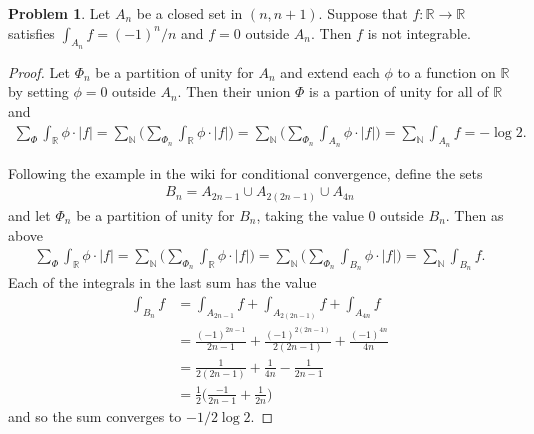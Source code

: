 \documentclass[20pt]{article}
\theoremstyle{plain}
\theoremstyle{definition}
\newtheorem*{problem}{Problem}
\newcommand{\reals}{\mathbb{R}}
\newcommand{\naturals}{\mathbb{N}}
\begin{document}
\begin{problem}{3.38}
  Let $A_n$ be a closed set in $(n, n+1)$. Suppose that $f: \reals \to \reals$
  satisfies $\int_{A_n}f = (-1)^n/n$ and $f=0$ outside $A_n.$ 
  Then $f$ is not integrable.
\end{problem}

\begin{proof}
  Let $\Phi_n$ be a partition of unity for $A_n$ and extend each 
  $\phi$ to a function on $\mathbb{R}$ by setting $\phi=0$ outside 
  $A_n$.
  Then their union $\Phi$ is a partion of unity for all of $\mathbb{R}$
  and 
  \begin{align*}
    \sum_\Phi \int_\mathbb{R} \phi \cdot |f| = 
    \sum_\naturals \bigg( \sum_{\Phi_n} \int_\reals \phi \cdot |f| \bigg) = 
    \sum_\naturals \bigg( \sum_{\Phi_n} \int_{A_n} \phi \cdot |f| \bigg) = 
    \sum_\naturals \int_{A_n}f = -\log 2.
  \end{align*}

  Following the example in the wiki for conditional convergence, 
  define the sets 
  \begin{align*}
    B_n = A_{2n - 1} \cup A_{2(2n-1)} \cup A_{4n}
  \end{align*}
  and let $\Phi_n$ be a partition of unity for $B_n$, taking the 
  value $0$ outside $B_n$.  Then as above
  \begin{align*}
    \sum_\Phi \int_\reals \phi \cdot |f| = 
    \sum_\naturals \bigg(\sum_{\Phi_n} \int_\reals \phi \cdot |f| \bigg) = 
    \sum_\naturals \bigg(\sum_{\Phi_n} \int_{B_n} \phi \cdot |f| \bigg) = 
    \sum_\naturals \int_{B_n}f.
  \end{align*} 
  Each of the integrals in the last sum has the value 
  \begin{align*}
    \int_{B_n}f
    &= \int_{A_{2n-1}}f + \int_{A_{2(2n-1)}}f + \int_{A_{4n}}f \\
    &=  \frac{(-1)^{2n-1}}{2n-1} + 
        \frac{(-1)^{2(2n-1)}}{2(2n-1)} + 
        \frac{(-1)^{4n}}{4n} \\
    &=  \frac{1}{2(2n-1)} +
        \frac{1}{4n} -
        \frac{1}{2n-1} \\
    &= \frac{1}{2} \bigg(
     \frac{-1}{2n-1} + \frac{1}{2n} \bigg)
  \end{align*}
  and so the sum converges to $-1/2 \log 2.$
\end{proof}
\end{document}
